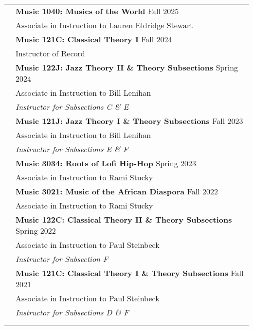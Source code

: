 \documentclass[letterpaper, 11pt]{article}
\begin{document}
\begin{longtable}{p{1.3in}p{4.8in}}
{\color{OliveGreen}{Courses Taught}}
& \textbf{Music 1040: Musics of the World} \hfill Fall 2025 \\
& Associate in Instruction to Lauren Eldridge Stewart \\
& \textbf{Music 121C: Classical Theory I} \hfill Fall 2024 \\
& Instructor of Record \\
& \textbf{Music 122J: Jazz Theory II \& Theory Subsections} \hfill Spring 2024 \\
& Associate in Instruction to Bill Lenihan \\
& \textit{Instructor for Subsections C \& E} \\
& \textbf{Music 121J: Jazz Theory I \& Theory Subsections} \hfill Fall 2023 \\
& Associate in Instruction to Bill Lenihan \\
& \textit{Instructor for Subsections E \& F} \\
& \textbf{Music 3034: Roots of Lofi Hip-Hop} \hfill Spring 2023 \\
& Associate in Instruction to Rami Stucky \\
& \textbf{Music 3021: Music of the African Diaspora} \hfill Fall 2022 \\
& Associate in Instruction to Rami Stucky \\
& \textbf{Music 122C: Classical Theory II \& Theory Subsections} \hfill Spring 2022 \\
& Associate in Instruction to Paul Steinbeck \\
& \textit{Instructor for Subsection F} \\
& \textbf{Music 121C: Classical Theory I \& Theory Subsections} \hfill Fall 2021 \\
& Associate in Instruction to Paul Steinbeck \\
& \textit{Instructor for Subsections D \& F} \\
& \\

\newpage


\end{longtable}
\end{document}
